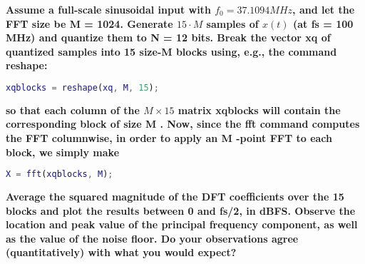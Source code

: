 \textbf{Assume a full-scale sinusoidal input with $f_0 = 37.1094 MHz$, and let the FFT size be M = 1024.
    Generate $15 \cdot M$ samples of $x(t)$ (at fs = 100 MHz) and quantize them to N = 12 bits. Break
    the vector xq of quantized samples into 15 size-M blocks using, e.g., the command reshape:}

\vspace{0.5cm}

\begin{lstlisting}[language=Matlab]
    xqblocks = reshape(xq, M, 15);
\end{lstlisting}

\textbf{so that each column of the $M \times 15$ matrix xqblocks will contain the corresponding block of size
    M . Now, since the fft command computes the FFT columnwise, in order to apply an M -point
    FFT to each block, we simply make
}
\begin{lstlisting}[language=Matlab]
    X = fft(xqblocks, M);
\end{lstlisting}

\textbf{Average the squared magnitude of the DFT coefficients over the 15 blocks and plot the results
    between 0 and fs/2, in dBFS.
    Observe the location and peak value of the principal frequency component, as well as the value
    of the noise floor. Do your observations agree (quantitatively) with what you would expect?
}